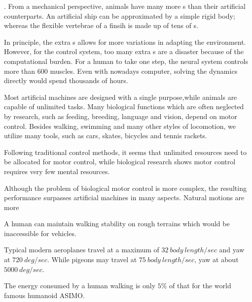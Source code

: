 \begin{itemize}
.
From a mechanical perspective, animals have many more {\dof}s than their artificial counterparts.
An artificial ship can be approximated by a simple rigid body; whereas the flexible vertebrae of a finsih is made up of tens of {\dof}s.


In principle, the extra {\dof}s allows for more variations in adapting the environment. 
However, for the control system, too many extra {\dof}s are a disaster because of the computational burden. 
For a human to take one step,  the neural system controls more than $600$ muscles.
Even with nowadays computer, solving the dynamics directly would spend thousands of hours.

 
Most artificial machines are designed with a single purpose,while animals are capable  of unlimited tasks.
Many biological functions which are often neglected by \cms research, such as feeding, breeding, language and vision, depend on motor control. 
Besides walking, swimming and many other styles of locomotion, we utilize many tools, such as cars, skates, bicycles and tennis rackets.

Following traditional control methods, it seems that unlimited resources need to be  allocated for motor control, while biological research shows motor control requires very few mental resources.

Although the problem of biological motor control is more complex, the resulting performance surpasses artificial machines in many aspects.
Natural motions are more
\begin{enumerate} 

A human can maintain walking stability on rough terrains which would be inaccessible for vehicles.

Typical modern aeroplanes  travel at a maximum of $32\: body\: length/sec$ and yaw at $720\: deg/sec$.
While pigeons may travel at $75 \:body\: length / sec$, yaw at about  $5000 \: deg/sec$.

The energy consumed by a human walking is only $5\%$ of that for the world famous humanoid ASIMO.
\end{enumerate}

\end{itemize}



